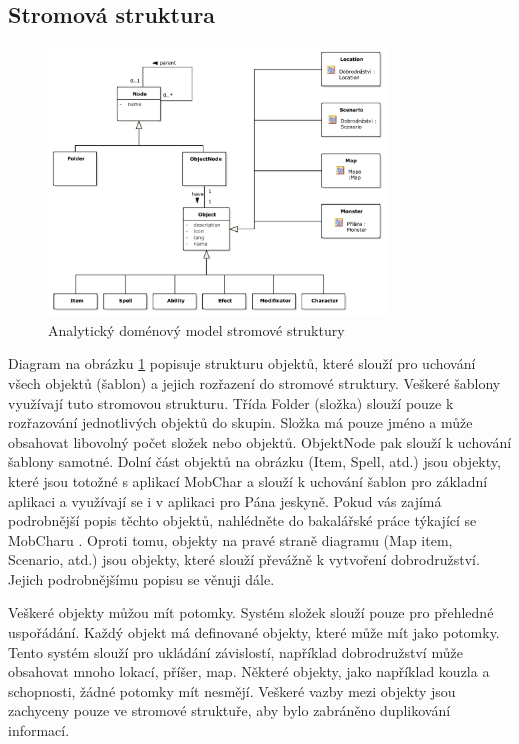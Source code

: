 \documentclass[thesis=B,czech]{resources/FITthesis}[2012/06/26]
\begin{document}
\subsection{Stromová struktura}
\begin{figure}\centering
	\includegraphics[width=0.8\textwidth]{images/domain_struktura}
	\caption[Analytický doménový model stromové struktury]{Analytický doménový model stromové struktury}\label{fig:dm_stromova_struktura}
\end{figure}
Diagram na obrázku \ref{fig:dm_stromova_struktura} popisuje strukturu objektů, které slouží pro uchování všech objektů (šablon) a jejich rozřazení do stromové struktury. Veškeré šablony využívají tuto stromovou strukturu. Třída Folder (složka) slouží pouze k rozřazování jednotlivých objektů do skupin. Složka má pouze jméno a může obsahovat libovolný počet složek nebo objektů. ObjektNode pak slouží k uchování šablony samotné. Dolní část objektů na obrázku (Item, Spell, atd.) jsou objekty, které jsou totožné s aplikací MobChar a slouží k uchování šablon pro základní aplikaci a využívají se i v aplikaci pro Pána jeskyně. Pokud vás zajímá podrobnější popis těchto objektů, nahlédněte do bakalářské práce týkající se MobCharu \cite{Weberova_2017}. Oproti tomu, objekty na pravé straně diagramu (Map item, Scenario, atd.) jsou objekty, které slouží převážně k vytvoření dobrodružství. Jejich podrobnějšímu popisu se věnuji dále.\par
Veškeré objekty můžou mít potomky. Systém složek slouží pouze pro přehledné uspořádání. Každý objekt má definované objekty, které může mít jako potomky. Tento systém slouží pro ukládání závislostí, například dobrodružství může obsahovat mnoho lokací, příšer, map. Některé objekty, jako například kouzla a schopnosti, žádné potomky mít nesmějí. Veškeré vazby mezi objekty jsou zachyceny pouze ve stromové struktuře, aby bylo zabráněno duplikování informací.
\end{document}
